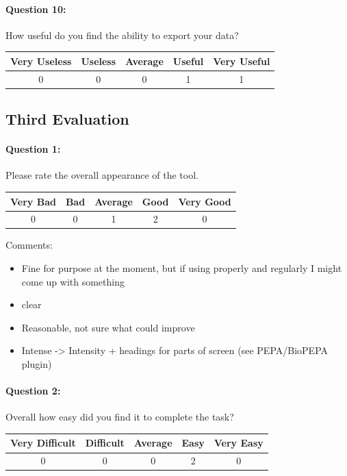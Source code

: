 \paragraph*{Question 10: } How useful do you find the ability to export your data?
\begin{center}
\begin{tabular}{ | c | c | c | c | c |}
    \hline
    Very Useless & Useless  & Average & Useful & Very Useful \\
    \hline
    0 & 0 & 0 & 1 & 1 \\
    \hline
\end{tabular}
\end{center}


\clearpage
\subsection{Third Evaluation}

\paragraph*{Question 1: } Please rate the overall appearance of the tool.

\begin{center}
\begin{tabular}{ | c | c | c | c | c |}
    \hline
    Very Bad & Bad & Average & Good & Very Good \\
    \hline
    0 & 0 & 1 & 2 & 0 \\
    \hline
\end{tabular}
\end{center}

Comments:
\begin{itemize}
\item Fine for purpose at the moment, but if using properly and regularly I might come up with something
\item clear
\item Reasonable, not sure what could improve
\item Intense -> Intensity + headings for parts of screen (see PEPA/BioPEPA plugin)
\end{itemize}


\paragraph*{Question 2: } Overall how easy did you find it to complete the task?

\begin{center}
\begin{tabular}{ | c | c | c | c | c |}
    \hline
    Very Difficult & Difficult & Average & Easy & Very Easy \\
    \hline
    0 & 0 & 0 & 2 & 0 \\
    \hline
\end{tabular}
\end{center}

